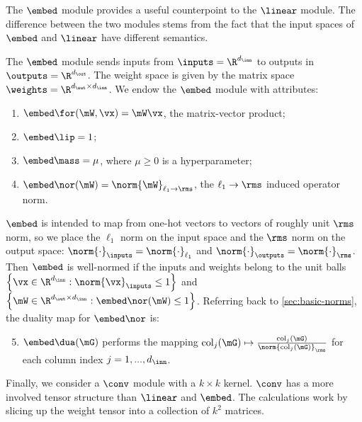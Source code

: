 The $\embed$ module provides a useful counterpoint to the $\linear$ module. The difference between the two modules stems from the fact that the input spaces of $\embed$ and $\linear$ have different semantics.
\begin{myexample} The $\embed$ module sends inputs from $\inputs = \R^{d_\inn}$ to outputs in $\outputs = \R^{d_\out}$. The weight space is given by the matrix space $\weights = \R^{d_\out \times d_\inn}$. We endow the $\embed$ module with attributes:

\begin{enumerate}
\setlength\itemsep{0em}
    \item $\embed\for(\mW,\vx) = \mW\vx$, the matrix-vector product;
    \item $\embed\lip = 1$;
    \item $\embed\mass = \mu$, where $\mu\geq 0$ is a hyperparameter;
    \item $\embed\nor(\mW) = \norm{\mW}_{\ell_1\to\rms}$, the $\ell_1\to\rms$ induced operator norm.
\end{enumerate}
$\embed$ is intended to map from one-hot vectors to vectors of roughly unit $\rms$ norm, so we place the $\ell_1$ norm on the input space and the $\rms$ norm on the output space: $\norm{\cdot}_\inputs = \norm{\cdot}_{\ell_1}$ and $\norm{\cdot}_\outputs = \norm{\cdot}_\rms$. Then $\embed$ is well-normed if the inputs and weights belong to the unit balls $\left\{\vx\in\R^{d_\inn}:\norm{\vx}_\inputs \leq 1\right\}$ and $\left\{\mW \in \R^{d_\out\times d_\inn}:\embed\nor(\mW)\leq1\right\}$. Referring back to \cref{sec:basic-norms}, the duality map for $\embed\nor$ is:

\begin{enumerate}
\setcounter{enumi}{4}
\setlength\itemsep{0em}
    \item $\embed\dua(\mG)$ performs the mapping $\mathrm{col}_j(\mG) \mapsto \frac{\mathrm{col}_j(\mG)}{ \norm{\mathrm{col}_j(\mG)}_\rms}$ for each column index $j=1,...,d_\inn$.
\end{enumerate}
\end{myexample}

Finally, we consider a $\conv$ module with a $k\times k$ kernel. $\conv$ has a more involved tensor structure than $\linear$ and $\embed$. The calculations work by slicing up the weight tensor into a collection of $k^2$ matrices.

